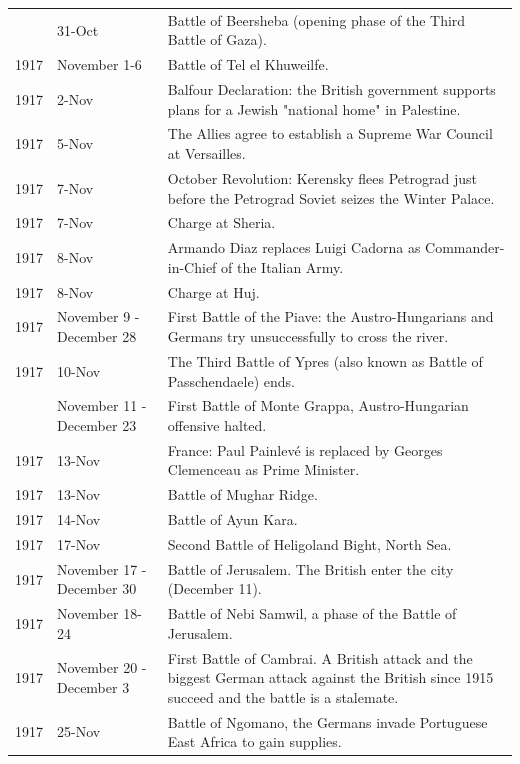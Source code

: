 \documentclass[
  openany]{book}
\begin{document}
\begin{longtable}[t]{rl>{\raggedright\arraybackslash}p{22em}}
\addlinespace
1917 & 31-Oct & Battle of Beersheba (opening phase of the Third Battle of Gaza).\\
\rowcolor{gray!6}  1917 & November 1-6 & Battle of Tel el Khuweilfe.\\
1917 & 2-Nov & Balfour Declaration: the British government supports plans for a Jewish "national home" in Palestine.\\
\rowcolor{gray!6}  1917 & 5-Nov & The Allies agree to establish a Supreme War Council at Versailles.\\
1917 & 7-Nov & October Revolution: Kerensky flees Petrograd just before the Petrograd Soviet seizes the Winter Palace.\\
\addlinespace
\rowcolor{gray!6}  1917 & 7-Nov & Charge at Sheria.\\
1917 & 8-Nov & Armando Diaz replaces Luigi Cadorna as Commander-in-Chief of the Italian Army.\\
\rowcolor{gray!6}  1917 & 8-Nov & Charge at Huj.\\
1917 & November 9 - December 28 & First Battle of the Piave: the Austro-Hungarians and Germans try unsuccessfully to cross the river.\\
\rowcolor{gray!6}  1917 & 10-Nov & The Third Battle of Ypres (also known as Battle of Passchendaele) ends.\\
\addlinespace
1917 & November 11 - December 23 & First Battle of Monte Grappa, Austro-Hungarian offensive halted.\\
\rowcolor{gray!6}  1917 & 13-Nov & France: Paul Painlevé is replaced by Georges Clemenceau as Prime Minister.\\
1917 & 13-Nov & Battle of Mughar Ridge.\\
\rowcolor{gray!6}  1917 & 14-Nov & Battle of Ayun Kara.\\
1917 & 17-Nov & Second Battle of Heligoland Bight, North Sea.\\
\addlinespace
\rowcolor{gray!6}  1917 & November 17 - December 30 & Battle of Jerusalem. The British enter the city (December 11).\\
1917 & November 18-24 & Battle of Nebi Samwil, a phase of the Battle of Jerusalem.\\
\rowcolor{gray!6}  1917 & November 20 - December 3 & First Battle of Cambrai. A British attack and the biggest German attack against the British since 1915 succeed and the battle is a stalemate.\\
1917 & 25-Nov & Battle of Ngomano, the Germans invade Portuguese East Africa to gain supplies.\\

\end{longtable}
\end{document}
